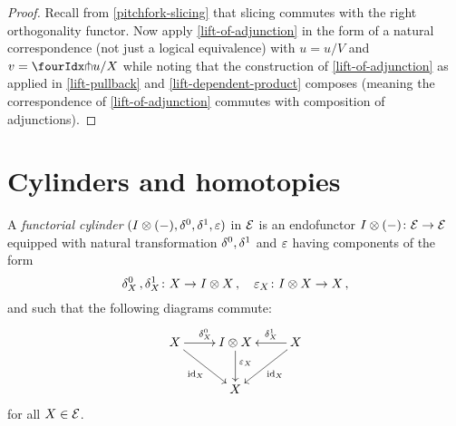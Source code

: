 \documentclass[reqno,10pt,a4paper,oneside]{amsart}
\begin{document}
\begin{proof}
Recall from \cref{pitchfork-slicing} that slicing commutes with the right orthogonality functor.
Now apply \cref{lift-of-adjunction} in the form of a natural correspondence (not just a logical equivalence) with $u = u/V$ and $v = \liftr{u}/X$ while noting that the construction of \cref{lift-of-adjunction} as applied in \cref{lift-pullback} and \cref{lift-dependent-product} composes (meaning the correspondence of \cref{lift-of-adjunction} commutes with composition of adjunctions).
\end{proof}


\section{Cylinders and homotopies}
\label{sec:preliminaries}



\begin{definition} \label{def:cylinder}
 A \emph{functorial cylinder} $(I \otimes (-), \delta^0, \delta^1, \varepsilon)$ in $\mathcal{E}$ 
is an endofunctor $I \otimes (-) \colon \mathcal{E} \to \mathcal{E}$ equipped with natural transformation $\delta^0, \delta^1$ and $\varepsilon$ having components
of the form
\[
\delta^0_X \, , \delta^1_X \colon X \to I \otimes X \, , \quad \varepsilon_X \colon I \otimes X \to X \, ,
 \]
and such that the following diagrams commute:
\[
\xymatrix{
X  \ar[r]^{\lcyl_X} \ar[dr]_{\id_X} & \interval \otimes X \ar[d]^-(.4){\varepsilon_X} & X \ar[dl]^{\id_X} \ar[l]_-{\rcyl_X}  \\
 & X & }
 \]
 for all $X \in \mathcal{E}$.
\end{definition}
\end{document}
